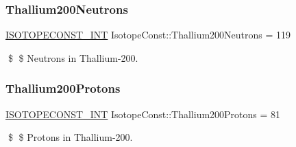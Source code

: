 \subsubsection{\texorpdfstring{Thallium200\+Neutrons}{Thallium200Neutrons}}
{\footnotesize\ttfamily \mbox{\hyperlink{group___isotope_const-_macros_ga5f18360b3e99483a35c32d789e62621c}{I\+S\+O\+T\+O\+P\+E\+C\+O\+N\+S\+T\+\_\+\+I\+NT}} Isotope\+Const\+::\+Thallium200\+Neutrons = 119}

\$ \$ Neutrons in Thallium-\/200. \mbox{\label{group___isotope_const-_thallium-_tl200_gac08aaf5e6f5fd1f41c22272996e2721d}} 
\subsubsection{\texorpdfstring{Thallium200\+Protons}{Thallium200Protons}}
{\footnotesize\ttfamily \mbox{\hyperlink{group___isotope_const-_macros_ga5f18360b3e99483a35c32d789e62621c}{I\+S\+O\+T\+O\+P\+E\+C\+O\+N\+S\+T\+\_\+\+I\+NT}} Isotope\+Const\+::\+Thallium200\+Protons = 81}

\$ \$ Protons in Thallium-\/200. 